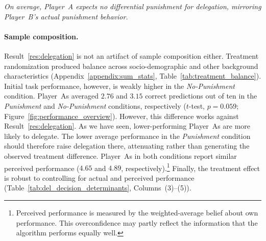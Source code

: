 \medskip
{} \textit{On average, Player~A expects no differential punishment for delegation, mirroring Player~B's actual punishment behavior.%
}
\medskip

\paragraph{Sample composition.} Result~\ref{res:delegation} is not an artifact of sample composition either. Treatment randomization produced balance across socio-demographic and other background characteristics (Appendix~\ref{appendix:sum_stats}, Table~\ref{tab:treatment_balance}). Initial task performance, however, is weakly higher in the \textit{No-Punishment} condition. Player~As averaged $2.76$ and $3.15$ correct predictions out of ten in the \textit{Punishment} and \textit{No-Punishment} conditions, respectively ($t$-test, $p=0.059$; Figure~\ref{fig:performance_overview}). However, this difference works against Result~\ref{res:delegation}. As we have seen, lower-performing Player~As are more likely to delegate. The lower average performance in the \textit{Punishment} condition should therefore raise delegation there, attenuating rather than generating the observed treatment difference. Player~As in both conditions report similar perceived performance ($4.65$ and $4.89$, respectively).\footnote{Perceived performance is measured by the weighted-average belief about own performance. This overconfidence may partly reflect the information that the algorithm performs equally well.} Finally, the treatment effect is robust to controlling for actual and perceived performance (Table~\ref{tab:del_decision_determinants}, Columns~(3)--(5)).


